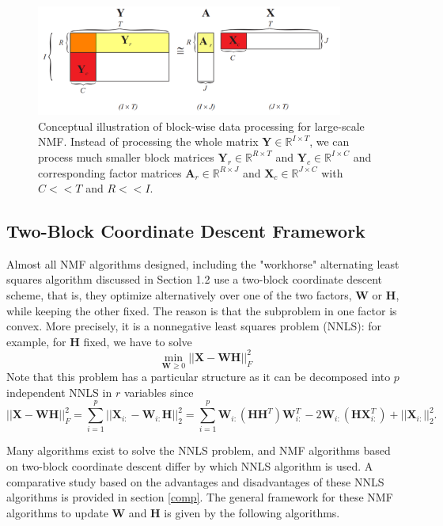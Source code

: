 \documentclass[11pt]{article}
\begin{document}
\begin{figure}[!htbp]
\centering
\includegraphics[width=0.9\textwidth]{large_scale}
\caption{Conceptual illustration of block-wise data processing for large-scale NMF. Instead of
processing the whole matrix $\mathbf{Y} \in \mathbb{R}^{I \times T}$, we can process much smaller block matrices $\mathbf{Y}_r \in \mathbb{R}^{R \times T}$ and $\mathbf{Y}_c \in \mathbb{R}^{I \times C}$ and corresponding factor matrices $\mathbf{A}_r \in \mathbb{R}^{R \times J}$ and $\mathbf{X}_c \in \mathbb{R}^{J \times C}$ with $C << T$ and $R << I$.}
\label{fig2}
\end{figure}
\FloatBarrier

\subsection{Two-Block Coordinate Descent Framework}
Almost all NMF algorithms designed, including the "workhorse" alternating least squares algorithm discussed in Section 1.2  use a two-block coordinate descent scheme, that is, they optimize alternatively over one of the two factors, $\mathbf{W}$ or $\mathbf{H}$, while keeping the other fixed. The reason is that the subproblem in one factor is convex. More precisely, it is a nonnegative least squares problem (NNLS): for example, for $\mathbf{H}$ fixed, we have to solve 
$$\min_{\mathbf{W} \geq 0} ||\mathbf{X-WH}||_F^2$$ 
Note that this problem has a particular structure as it can be decomposed into $p$ independent NNLS in $r$ variables since 
\begin{equation} \label{sepr}
||\mathbf{X-WH}||_F^2  
= \sum_{i=1}^p  ||\mathbf{X}_{i:}-\mathbf{W}_{i:}\mathbf{H}||_2^2
= \sum_{i=1}^p \mathbf{W}_{i:} \left(\mathbf{HH}^T\right) \mathbf{W}_{i:}^T - 2  \mathbf{W}_{i:} \left(\mathbf{HX}_{i:}^T\right) + ||\mathbf{X}_{i:}||_2^2. 
\end{equation}

Many algorithms exist to solve the NNLS problem, and NMF algorithms based on two-block coordinate descent differ by which NNLS algorithm is used. A comparative study based on the advantages and disadvantages of these NNLS algorithms is provided in section \ref{comp}. The general framework for these NMF algorithms to update $\mathbf{W}$ and $\mathbf{H}$ is given by the following algorithms.
\end{document}
